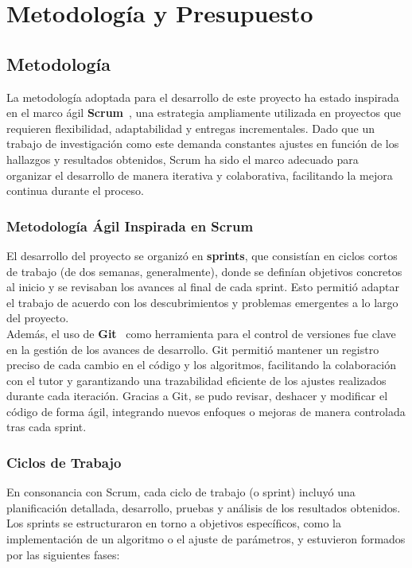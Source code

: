 \chapter{Metodología y Presupuesto}\label{ch:metodologia-y-presupuesto}
\section{Metodología}\label{sec:metodologia}
La metodología adoptada para el desarrollo de este proyecto ha estado inspirada en el marco ágil
\textbf{Scrum}~\cite{}, una estrategia ampliamente utilizada en proyectos que requieren flexibilidad,
adaptabilidad y entregas incrementales.
Dado que un trabajo de investigación como este demanda constantes ajustes en función de los hallazgos y resultados
obtenidos, Scrum ha sido el marco adecuado para organizar el desarrollo de manera iterativa y colaborativa, facilitando
la mejora continua durante el proceso.

\subsection{Metodología Ágil Inspirada en Scrum}\label{subsec:metodologia-agil-inspirada-en-scrum}
El desarrollo del proyecto se organizó en \textbf{sprints}, que consistían en ciclos cortos de
trabajo (de dos semanas, generalmente), donde se definían objetivos concretos al inicio y se revisaban los avances al
final de cada sprint.
Esto permitió adaptar el trabajo de acuerdo con los descubrimientos y problemas emergentes a lo largo del proyecto.
\\[6pt]

Además, el uso de \textbf{Git}~\cite{} como herramienta para el control de versiones fue clave en la gestión
de los avances de desarrollo.
Git permitió mantener un registro preciso de cada cambio en el código y los algoritmos, facilitando la colaboración con
el tutor y garantizando una trazabilidad eficiente de los ajustes realizados durante cada iteración.
Gracias a Git, se pudo revisar, deshacer y modificar el código de forma ágil, integrando nuevos enfoques o mejoras de
manera controlada tras cada sprint.

\subsection{Ciclos de Trabajo}\label{subsec:ciclos-de-trabajo}
En consonancia con Scrum, cada ciclo de trabajo (o sprint) incluyó una planificación detallada, desarrollo, pruebas y
análisis de los resultados obtenidos.
Los sprints se estructuraron en torno a objetivos específicos, como la implementación de un algoritmo o el ajuste de
parámetros, y estuvieron formados por las siguientes fases:

